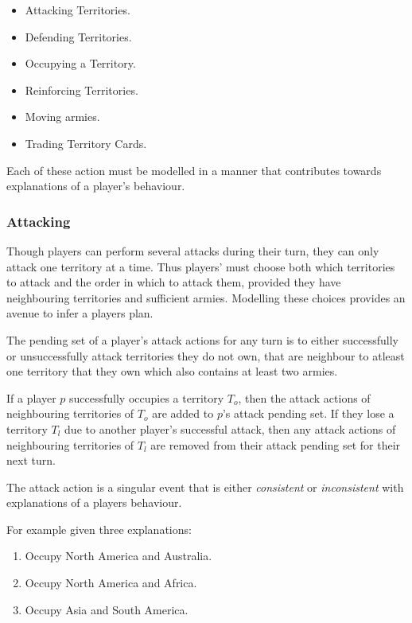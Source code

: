 \documentclass[parskip]{cs4rep}
\begin{document}
\begin{itemize}
\item
Attacking Territories.
\item
Defending Territories.
\item
Occupying a Territory.
\item
Reinforcing Territories.
\item
Moving armies.
\item
Trading Territory Cards.
\end{itemize}

Each of these action must be modelled in a manner that contributes towards explanations of a player's behaviour.

\subsubsection{Attacking}

Though players can perform several attacks during their turn, they can only attack one territory at a time. Thus players' must choose both which territories to attack and the order in which to attack them, provided they have neighbouring territories and sufficient armies. Modelling these choices provides an avenue to infer a players plan.

The pending set of a player's attack actions for any turn is to either successfully or unsuccessfully attack territories they do not own, that are neighbour to atleast one territory that they own which also contains at least two armies.

If a player $p$ successfully occupies a territory $T_{o}$, then the attack actions of neighbouring territories of $T_{o}$ are added to $p$'s attack pending set. If they lose a territory $T_{l}$ due to another player's successful attack, then any attack actions of neighbouring territories of $T_{l}$ are removed from their attack pending set for their next turn. 

The attack action is a singular event that is either \textit{consistent} or \textit{inconsistent} with explanations of a players behaviour. 

For example given three explanations:

\begin{enumerate}
\item
Occupy North America and Australia.
\item
Occupy North America and Africa.
\item
Occupy Asia and South America.
\end{enumerate}
\end{document}
